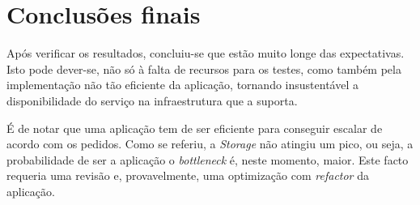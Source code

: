 \section{Conclusões finais}

Após verificar os resultados, concluiu-se que estão muito longe das expectativas. Isto pode dever-se, não só à falta de recursos para os testes, como também pela implementação não tão eficiente da aplicação, tornando insustentável a disponibilidade do serviço na infraestrutura que a suporta.

É de notar que uma aplicação tem de ser eficiente para conseguir escalar de acordo com os pedidos. Como se referiu, a \emph{Storage} não atingiu um pico, ou seja, a probabilidade de ser a aplicação o \emph{bottleneck} é, neste momento, maior. Este facto requeria uma revisão e, provavelmente, uma optimização com \emph{refactor} da aplicação.
